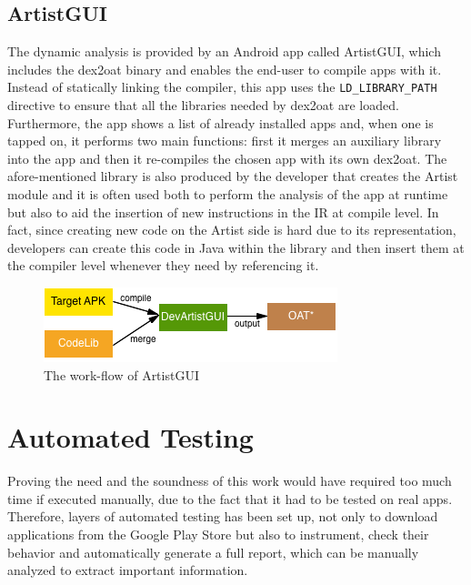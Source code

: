 \subsection{ArtistGUI}
The dynamic analysis is provided by an Android app called ArtistGUI, which includes the dex2oat binary and enables the end-user to compile apps with it. Instead of statically linking the compiler, this app uses the \texttt{LD\_LIBRARY\_PATH} directive to ensure that all the libraries needed by dex2oat are loaded. Furthermore, the app shows a list of already installed apps and, when one is tapped on, it performs two main functions: first it merges an auxiliary library into the app and then it re-compiles the chosen app with its own dex2oat. The afore-mentioned library is also produced by the developer that creates the Artist module and it is often used both to perform the analysis of the app at runtime but also to aid the insertion of new instructions in the IR at compile level. In fact, since creating new code on the Artist side is hard due to its representation, developers can create this code in Java within the library and then insert them at the compiler level whenever they need by referencing it.

\begin{figure}[H]
	\centering
	\includegraphics{img/devartistgui.png}
	\caption{The work-flow of ArtistGUI}
	\label{fig:installprocess}
\end{figure}

\section{Automated Testing}
Proving the need and the soundness of this work would have required too much time if executed manually, due to the fact that it had to be tested on real apps. Therefore, layers of automated testing has been set up, not only to download applications from the Google Play Store but also to instrument, check their behavior and automatically generate a full report, which can be manually analyzed to extract important information.

